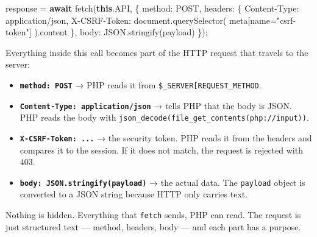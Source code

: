 \documentclass[11pt,a4paper,oneside]{book}
\newenvironment{Shaded}{\begin{snugshade}}{\end{snugshade}}
\newcommand{\KeywordTok}[1]{\textcolor[HTML]{007020}{\textbf{#1}}}
\newcommand{\DataTypeTok}[1]{\textcolor[HTML]{902000}{#1}}
\newcommand{\StringTok}[1]{\textcolor[HTML]{4070A0}{#1}}
\newcommand{\FunctionTok}[1]{\textcolor[HTML]{06287E}{#1}}
\newcommand{\ControlFlowTok}[1]{\textcolor[HTML]{007020}{\textbf{#1}}}
\newcommand{\OperatorTok}[1]{\textcolor[HTML]{666666}{#1}}
\newcommand{\BuiltInTok}[1]{#1}
\newcommand{\AttributeTok}[1]{\textcolor[HTML]{7D9029}{#1}}
\newcommand{\NormalTok}[1]{#1}
\providecommand{\tightlist}{%
  \setlength{\itemsep}{0pt}\setlength{\parskip}{0pt}}
\begin{document}
\begin{Shaded}
\begin{Highlighting}[]
\NormalTok{response }\OperatorTok{=} \ControlFlowTok{await} \FunctionTok{fetch}\NormalTok{(}\KeywordTok{this}\OperatorTok{.}\AttributeTok{API}\OperatorTok{,}\NormalTok{ \{}
    \DataTypeTok{method}\OperatorTok{:} \StringTok{\textquotesingle{}POST\textquotesingle{}}\OperatorTok{,}
    \DataTypeTok{headers}\OperatorTok{:}\NormalTok{ \{}
        \StringTok{\textquotesingle{}Content{-}Type\textquotesingle{}}\OperatorTok{:} \StringTok{\textquotesingle{}application/json\textquotesingle{}}\OperatorTok{,}
        \StringTok{\textquotesingle{}X{-}CSRF{-}Token\textquotesingle{}}\OperatorTok{:} \BuiltInTok{document}\OperatorTok{.}\FunctionTok{querySelector}\NormalTok{(}
            \StringTok{\textquotesingle{}meta[name="csrf{-}token"]\textquotesingle{}}
\NormalTok{        )}\OperatorTok{.}\AttributeTok{content}
\NormalTok{    \}}\OperatorTok{,}
    \DataTypeTok{body}\OperatorTok{:} \BuiltInTok{JSON}\OperatorTok{.}\FunctionTok{stringify}\NormalTok{(payload)}
\NormalTok{\})}\OperatorTok{;}
\end{Highlighting}
\end{Shaded}

Everything inside this call becomes part of the HTTP request that
travels to the server:

\begin{itemize}
\tightlist
\item
  \textbf{\texttt{method:\ \textquotesingle{}POST\textquotesingle{}}}
  → PHP reads it from
  \texttt{\$\_SERVER{[}\textquotesingle{}REQUEST\_METHOD\textquotesingle{}{]}}.
\item
  \textbf{\texttt{\textquotesingle{}Content-Type\textquotesingle{}:\ \textquotesingle{}application/json\textquotesingle{}}}
  → tells PHP that the body is JSON. PHP reads the body with
  \texttt{json\_decode(file\_get\_contents(\textquotesingle{}php://input\textquotesingle{}))}.
\item
  \textbf{\texttt{\textquotesingle{}X-CSRF-Token\textquotesingle{}:\ ...}}
  → the security token. PHP reads it from the headers and
  compares it to the session. If it does not match, the request
  is rejected with 403.
\item
  \textbf{\texttt{body:\ JSON.stringify(payload)}} → the actual
  data. The \texttt{payload} object is converted to a JSON string
  because HTTP only carries text.
\end{itemize}

Nothing is hidden. Everything that \texttt{fetch} sends, PHP can
read. The request is just structured text --- method, headers,
body --- and each part has a purpose.
\end{document}
